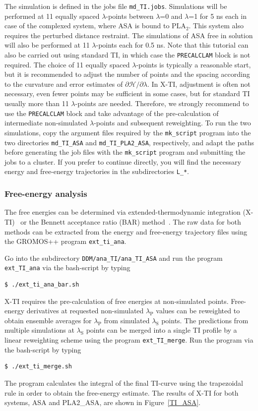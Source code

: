 The simulation is defined in the jobs file \texttt{md\_TI.jobs}. Simulations will be performed at 11 equally spaced $\lambda$-points between $\lambda$=0 and $\lambda$=1 for 5 ns each in case of the complexed system, where ASA is bound to PLA$_2$. This system also requires the perturbed distance restraint. The simulations of ASA free in solution will also be performed at 11 $\lambda$-points each for 0.5 ns.   
Note that this tutorial can also be carried out using standard TI, in which case the \texttt{PRECALCLAM} block is not required. 
The choice of 11 equally spaced $\lambda$-points is typically a reasonable start, but it is recommended to adjust the number of points and the spacing according to the curvature and error estimates of $\partial\mathcal{H}/\partial\lambda$. 
In X-TI, adjustment is often not necessary, even fewer points may be sufficient in some cases, but for standard TI usually more than 11 $\lambda$-points are needed. 
Therefore, we strongly recommend to use the \texttt{PRECALCLAM} block and take advantage of the pre-calculation of intermediate non-simulated $\lambda$-points and subsequent reweighting.
To run the two simulations, copy the argument files required by the \texttt{mk\_script} program into the two directories \texttt{md\_TI\_ASA} and \texttt{md\_TI\_PLA2\_ASA}, respectively, and adapt the paths before generating the job files with the \texttt{mk\_script} program and submitting the jobs to a cluster. If you prefer to continue directly, you will find the necessary energy and free-energy trajectories in the subdirectories \texttt{L\_*}.

\subsubsection{Free-energy analysis}
The free energies can be determined via extended-thermodynamic integration (X-TI)~\cite{X_TI} or the Bennett acceptance ratio (BAR) method~\cite{bar}. The raw data for both methods can be extracted from the energy and free-energy trajectory files using the GROMOS++ program \texttt{ext\_ti\_ana}. 

Go into the subdirectory \texttt{DDM/ana\_TI/ana\_TI\_ASA} and run the program \texttt{ext\_TI\_ana} via the bash-script by typing
\begin{lstlisting}
$ ./ext_ti_ana_bar.sh
\end{lstlisting}
%
X-TI requires the pre-calculation of free energies at non-simulated points. Free-energy derivatives at requested non-simulated $\lambda_{\text{P}}$ values can be reweighted to obtain ensemble averages for $\lambda_{\text{P}}$ from simulated $\lambda_{\text{S}}$ points. The predictions from multiple simulations at $\lambda_{\text{S}}$ points can be merged into a single TI profile by a linear reweighting scheme using the program \texttt{ext\_TI\_merge}. 
Run the program via the bash-script by typing
\begin{lstlisting}
$ ./ext_ti_merge.sh
\end{lstlisting}
%
The program calculates the integral of the final TI-curve using the trapezoidal rule in order to obtain the free-energy estimate. The results of X-TI for both systems, ASA and PLA2\_ASA, are shown in Figure~\ref{TI_ASA}.  


